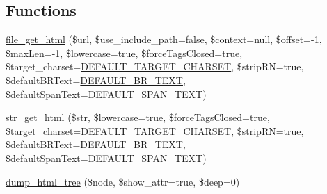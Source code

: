 \subsection*{Functions}
\begin{DoxyCompactItemize}
\item 
\hyperlink{simple__html__dom_8php_af2164941db8b68168c1105687e179d27}{file\+\_\+get\+\_\+html} (\$url, \$use\+\_\+include\+\_\+path=false, \$context=null, \$offset=-\/1, \$max\+Len=-\/1, \$lowercase=true, \$force\+Tags\+Closed=true, \$target\+\_\+charset=\hyperlink{simple__html__dom_8php_aeb01f6d83a65d695ad327473f838319a}{D\+E\+F\+A\+U\+L\+T\+\_\+\+T\+A\+R\+G\+E\+T\+\_\+\+C\+H\+A\+R\+S\+ET}, \$strip\+RN=true, \$default\+B\+R\+Text=\hyperlink{simple__html__dom_8php_a898bdf60fe4d05c1c50013eed5e2c6e8}{D\+E\+F\+A\+U\+L\+T\+\_\+\+B\+R\+\_\+\+T\+E\+XT}, \$default\+Span\+Text=\hyperlink{simple__html__dom_8php_a30d58d7d3a53efc61f064b53a434bafe}{D\+E\+F\+A\+U\+L\+T\+\_\+\+S\+P\+A\+N\+\_\+\+T\+E\+XT})
\item 
\hyperlink{simple__html__dom_8php_a2a9c7626f0cb0a56eb81709124a08922}{str\+\_\+get\+\_\+html} (\$str, \$lowercase=true, \$force\+Tags\+Closed=true, \$target\+\_\+charset=\hyperlink{simple__html__dom_8php_aeb01f6d83a65d695ad327473f838319a}{D\+E\+F\+A\+U\+L\+T\+\_\+\+T\+A\+R\+G\+E\+T\+\_\+\+C\+H\+A\+R\+S\+ET}, \$strip\+RN=true, \$default\+B\+R\+Text=\hyperlink{simple__html__dom_8php_a898bdf60fe4d05c1c50013eed5e2c6e8}{D\+E\+F\+A\+U\+L\+T\+\_\+\+B\+R\+\_\+\+T\+E\+XT}, \$default\+Span\+Text=\hyperlink{simple__html__dom_8php_a30d58d7d3a53efc61f064b53a434bafe}{D\+E\+F\+A\+U\+L\+T\+\_\+\+S\+P\+A\+N\+\_\+\+T\+E\+XT})
\item 
\hyperlink{simple__html__dom_8php_a1f67414b1908776b16f3fc8c6953c13f}{dump\+\_\+html\+\_\+tree} (\$node, \$show\+\_\+attr=true, \$deep=0)
\end{DoxyCompactItemize}
